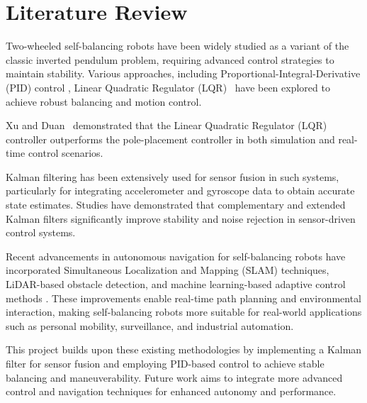\section{Literature Review}
Two-wheeled self-balancing robots have been widely studied as a variant of the classic inverted pendulum problem, requiring advanced control strategies to maintain stability. Various approaches, including Proportional-Integral-Derivative (PID) control \cite{matlab_inverted_pendulum}, Linear Quadratic Regulator (LQR)~\cite{10193276} have been explored to achieve robust balancing and motion control.

Xu and Duan~\cite{1174486} demonstrated that the Linear Quadratic Regulator (LQR) controller outperforms the pole-placement controller in both simulation and real-time control scenarios.

Kalman filtering has been extensively used for sensor fusion in such systems, particularly for integrating accelerometer and gyroscope data to obtain accurate state estimates. Studies have demonstrated that complementary and extended Kalman filters significantly improve stability and noise rejection in sensor-driven control systems.

Recent advancements in autonomous navigation for self-balancing robots have incorporated Simultaneous Localization and Mapping (SLAM) techniques, LiDAR-based obstacle detection, and machine learning-based adaptive control methods \cite{Tsai_Chih_2008} \cite{Ranasinghe_Vidanapathirana_2019}. These improvements enable real-time path planning and environmental interaction, making self-balancing robots more suitable for real-world applications such as personal mobility, surveillance, and industrial automation.

This project builds upon these existing methodologies by implementing a Kalman filter for sensor fusion and employing PID-based control to achieve stable balancing and maneuverability. Future work aims to integrate more advanced control and navigation techniques for enhanced autonomy and performance.


